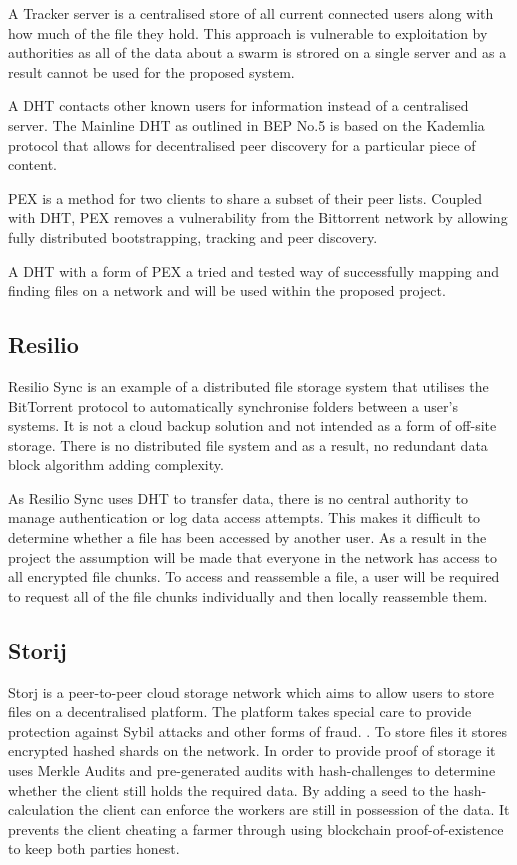 \documentclass[a4paper,11pt, twocolumn]{report}
\begin{document}
A Tracker server is a centralised store of all current connected users along with how much of the file they hold. This approach is vulnerable to exploitation by authorities as all of the data about a swarm is strored on a single server and as a result cannot be used for the proposed system.

A DHT contacts other known users for information instead of a centralised server. The Mainline DHT as outlined in BEP No.5 is based on the Kademlia protocol that allows for decentralised peer discovery for a particular piece of content.

PEX is a method for two clients to share a subset of their peer lists. Coupled with DHT, PEX removes a vulnerability from the Bittorrent network by allowing fully distributed bootstrapping, tracking and peer discovery.

A DHT with a form of PEX a tried and tested way of successfully mapping and finding files on a network and will be used within the proposed project.

\subsection{Resilio}
Resilio Sync is an example of a distributed file storage system that utilises the BitTorrent protocol to automatically synchronise folders between a user’s systems. It is not a cloud backup solution and not intended as a form of off-site storage. There is no distributed file system and as a result, no redundant data block algorithm adding complexity. \citep{farina2014bittorrent}

As Resilio Sync uses DHT to transfer data, there is no central authority to manage authentication or log data access attempts. This makes it difficult to determine whether a file has been accessed by another user. \citep{farina2014bittorrent} As a result in the project the assumption will be made that everyone in the network has access to all encrypted file chunks. To access and reassemble a file, a user will be required to request all of the file chunks individually and then locally reassemble them.

\subsection{Storij}
Storj is a peer-to-peer cloud storage network which aims to allow users to store files on a decentralised platform. The platform takes special care to provide protection against Sybil attacks and other forms of fraud. \citep{Wilkinson14storja}. To store files it stores encrypted hashed shards on the network. In order to provide proof of storage it uses Merkle Audits and pre-generated audits with hash-challenges to determine whether the client still holds the required data. By adding a seed to the hash-calculation the client can enforce the workers are still in possession of the data. It prevents the client cheating a farmer through using blockchain proof-of-existence to keep both parties honest.
\end{document}
